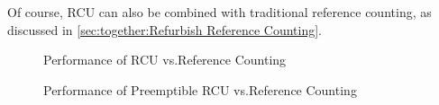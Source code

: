 Of course, RCU can also be combined with traditional reference counting,
as discussed in
\cref{sec:together:Refurbish Reference Counting}.

\begin{figure}
\centering
{}
\caption{Performance of RCU vs.\@ Reference Counting}
\label{fig:defer:Performance of RCU vs. Reference Counting}
\end{figure}

\begin{figure}
\centering
{}
\caption{Performance of Preemptible RCU vs.\@ Reference Counting}
\label{fig:defer:Performance of Preemptible RCU vs. Reference Counting}
\end{figure}


